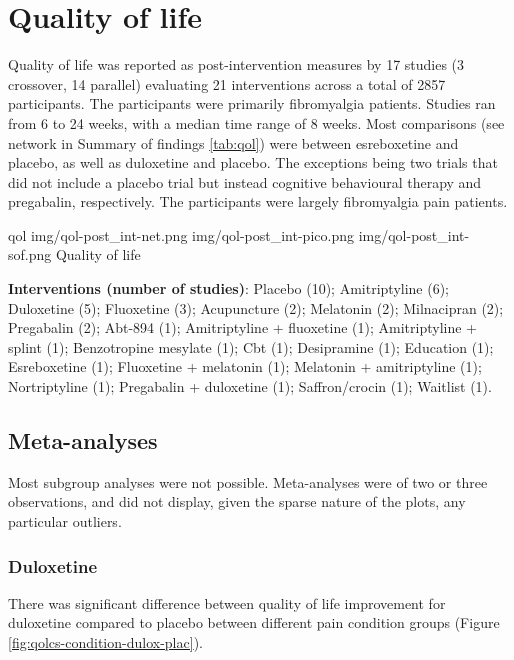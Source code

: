 \documentclass{report}\usepackage[]{graphicx}\usepackage[]{color}
\begin{document}
\section{Quality of life}

Quality of life was reported as post-intervention measures by 17 studies (3 crossover, 14 parallel) evaluating 21 interventions across a total of 2857 participants. The participants were primarily fibromyalgia patients. Studies ran from 6 to 24 weeks, with a median time range of 8 weeks. Most comparisons (see network in Summary of findings \ref{tab:qol}) were between esreboxetine and placebo, as well as duloxetine and placebo. The exceptions being two trials that did not include a placebo trial but instead cognitive behavioural therapy and pregabalin, respectively. The participants were largely fibromyalgia pain patients.


\soffignew
{qol}
{img/qol-post_int-net.png}
{img/qol-post_int-pico.png}
{img/qol-post_int-sof.png}
{Quality of life}

\textbf{Interventions (number of studies)}: Placebo (10); Amitriptyline (6); Duloxetine (5); Fluoxetine (3); Acupuncture (2); Melatonin (2); Milnacipran (2); Pregabalin (2); Abt-894 (1); Amitriptyline + fluoxetine (1); Amitriptyline + splint (1); Benzotropine mesylate (1); Cbt (1); Desipramine (1); Education (1); Esreboxetine (1); Fluoxetine + melatonin (1); Melatonin + amitriptyline (1); Nortriptyline (1); Pregabalin + duloxetine (1); Saffron/crocin (1); Waitlist (1).


\subsection{Meta-analyses}

Most subgroup analyses were not possible. Meta-analyses were of two or three observations, and did not display, given the sparse nature of the plots, any particular outliers.

\subsubsection{Duloxetine}

There was significant difference between quality of life improvement for duloxetine compared to placebo between different pain condition groups (Figure \ref{fig:qolcs-condition-dulox-plac}).
\end{document}
